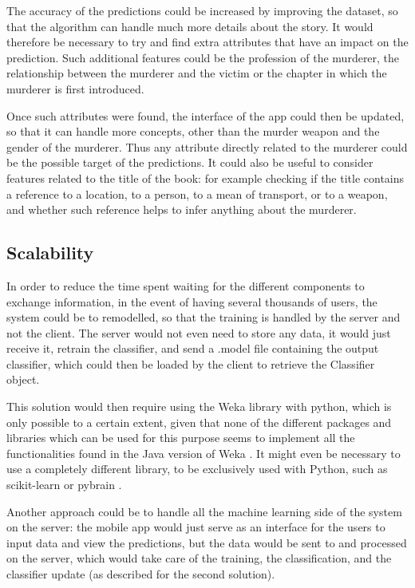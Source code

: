 \documentclass{mproj}
\begin{document}
The accuracy of the predictions could be increased by improving the dataset, so that the algorithm can handle much more details about the story. It would therefore be necessary to try and find extra attributes that have an impact on the prediction. Such additional features could be the profession of the murderer, the relationship between the murderer and the victim or the chapter in which the murderer is first introduced. \par

Once such attributes were found, the interface of the app could then be updated, so that it can handle more concepts, other than the murder weapon and the gender of the murderer. Thus any attribute directly related to the murderer could be the possible target of the predictions.
It could also be useful to consider features related to the title of the book: for example checking if the title contains a reference to a location, to a person, to a mean of transport, or to a weapon, and whether such reference helps to infer anything about the murderer.
	
\subsection{Scalability}

In order to reduce the time spent waiting for the different components to exchange information, in the event of having several thousands of users, the system could be to remodelled, so that the training is handled by the server and not the client. The server would not even need to store any data, it would just receive it, retrain the classifier, and send a .model file containing the output classifier, which could then be loaded by the client to retrieve the Classifier object. \par

This solution would then require using the Weka library with python, which is only possible to a certain extent, given that none of the different packages and libraries which can be used for this purpose seems to implement all the functionalities found in the Java version of Weka \cite{wekapython}. It might even be necessary to use a completely different library, to be exclusively used with Python, such as scikit-learn \cite{scikit-learn} or pybrain \cite{pybrain}. \par

Another approach could be to handle all the machine learning side of the system on the server: the mobile app would just serve as an interface for the users to input data and view the predictions, but the data would be sent to and processed on the server, which would take care of the training, the classification, and the classifier update (as described for the second solution). \par
\end{document}
